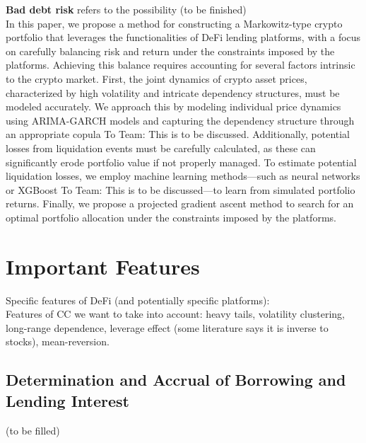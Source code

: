 \documentclass{article} %
\providecommand{\red}[1]{\textcolor{BrickRed}{#1}}
\theoremstyle{plain}
\theoremstyle{definition} %
\begin{document}
{\bf Bad debt risk} refers to the possibility (to be finished)\\%

In this paper, we propose a method for constructing a Markowitz-type crypto portfolio that leverages the functionalities of DeFi lending platforms, 
 with a focus on carefully balancing risk and return under the constraints imposed by the platforms. 
 Achieving this balance requires accounting for several factors intrinsic to the crypto market. 
 First, the joint dynamics of crypto asset prices, characterized by high volatility and intricate dependency structures, must be modeled accurately. 
 We approach this by modeling individual price dynamics using ARIMA-GARCH models and capturing the dependency structure through an appropriate copula {\red{To Team: This is to be discussed}}.
 Additionally, potential losses from liquidation events must be carefully calculated, as these can significantly erode portfolio value if not properly managed.
 To estimate potential liquidation losses, we employ machine learning methods—such as neural networks or XGBoost {\red{To Team: This is to be discussed}}—to learn from simulated portfolio returns.
 Finally, we propose a projected gradient ascent method to search for an optimal portfolio allocation under the constraints imposed by the platforms. 


\section{Important Features}
Specific features of DeFi (and potentially specific platforms):\\
Features of CC we want to take into account: heavy tails, volatility clustering, long-range dependence, leverage effect (some literature says it is inverse to stocks), mean-reversion.

\subsection{Determination and Accrual of Borrowing and Lending Interest}
(to be filled)
\end{document}
